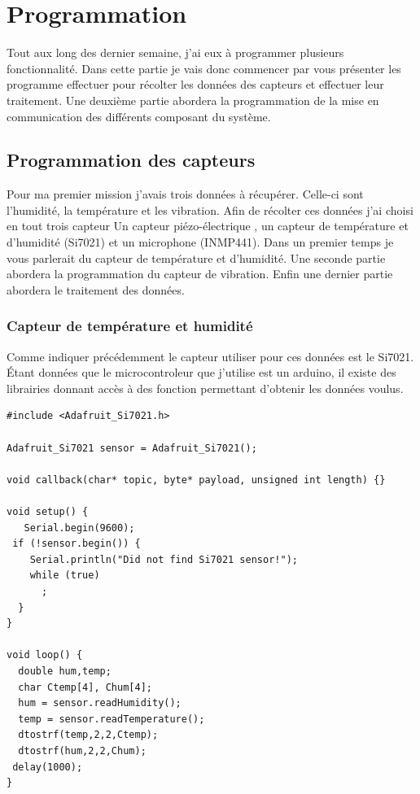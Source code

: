\documentclass[11pt,french,a4paper]{article}
\begin{document}
\section{Programmation}
Tout aux long des dernier semaine, j'ai eux à programmer plusieurs fonctionnalité. Dans cette partie je vais donc commencer par vous présenter les programme effectuer pour récolter les données des capteurs et effectuer leur traitement. Une deuxième partie abordera la programmation de la mise en communication des différents composant du système.
\subsection{Programmation des capteurs}
Pour ma premier mission j'avais trois  données à récupérer. Celle-ci sont l'humidité, la température et les vibration. Afin de récolter ces données j'ai choisi en tout trois capteur Un capteur piézo-électrique , un capteur de température et d'humidité (Si7021) et un microphone (INMP441). Dans un premier temps je vous parlerait du capteur de température et d'humidité. Une seconde partie abordera la programmation du capteur de vibration. Enfin une dernier partie abordera le traitement des données.  

\subsubsection{Capteur de température et humidité}
Comme indiquer précédemment le capteur utiliser pour ces données est le Si7021. Étant données que le microcontroleur que j'utilise est un arduino, il existe des librairies donnant accès à des fonction permettant d'obtenir les données voulus.
\begin{scriptsize}
	\begin{lstlisting}
#include <Adafruit_Si7021.h>

Adafruit_Si7021 sensor = Adafruit_Si7021();

void callback(char* topic, byte* payload, unsigned int length) {}

void setup() {
   Serial.begin(9600);
 if (!sensor.begin()) {
    Serial.println("Did not find Si7021 sensor!");
    while (true)
      ;
  }
}

void loop() {
  double hum,temp;
  char Ctemp[4], Chum[4];
  hum = sensor.readHumidity();
  temp = sensor.readTemperature();
  dtostrf(temp,2,2,Ctemp);
  dtostrf(hum,2,2,Chum);
 delay(1000);
}	
	\end{lstlisting}
\end{scriptsize}
\end{document}
